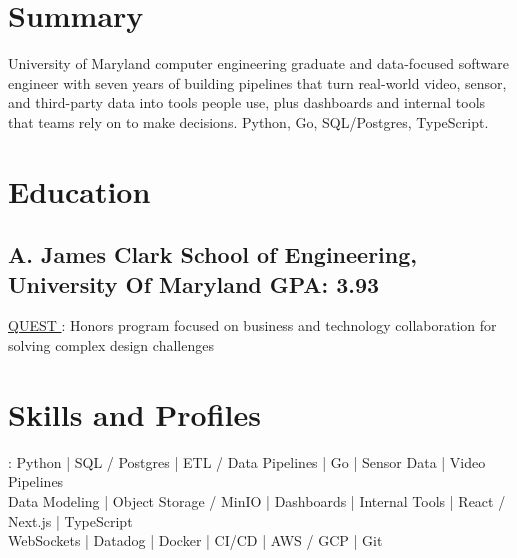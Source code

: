 \documentclass[print]{jack-resume}
\begin{document}
\pagecolor{darkmodeBackground}


\begin{minipage}[t][1cm][t]{.03\textwidth}
    \hfill
\end{minipage}

\section{Summary}
University of Maryland computer engineering graduate and data-focused software engineer with seven years of building pipelines that turn real-world video, sensor, and third-party data into tools people use, plus dashboards and internal tools that teams rely on to make decisions. Python, Go, SQL/Postgres, TypeScript.
\sectionsep

\section{Education}
\subsection{A. James Clark School of Engineering, University Of Maryland \hfill GPA: 3.93}
 \hfill
\begin{tightemize}
    \item \color{darkmodePrimary}\href{https://www.rhsmith.umd.edu/programs/undergraduate-programs/academics/fellows-special-programs/quest}{QUEST \ExternalLink}: Honors program focused on business and technology collaboration for solving complex design challenges
\end{tightemize}
\sectionsep

\section{Skills and Profiles}
:
Python \hfill | \hfill
SQL / Postgres \hfill | \hfill
ETL / Data Pipelines \hfill | \hfill
Go \hfill | \hfill
Sensor Data \hfill | \hfill
Video Pipelines \\
\hspace{1.0cm} Data Modeling \hfill | \hfill
Object Storage / MinIO \hfill | \hfill
Dashboards \hfill | \hfill
Internal Tools \hfill | \hfill
React / Next.js \hfill | \hfill
TypeScript \\
\hspace{1.0cm} WebSockets \hfill | \hfill
Datadog \hfill | \hfill
Docker \hfill | \hfill
CI/CD \hfill | \hfill
AWS / GCP \hfill | \hfill
Git \\
\end{document}
